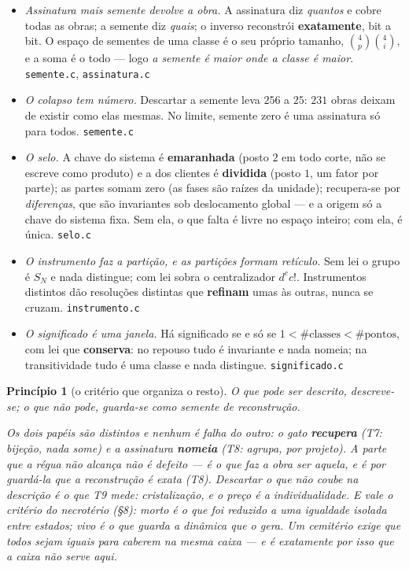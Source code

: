 \documentclass[11pt]{article}
\newcommand{\code}[1]{\texttt{\small #1}}
\theoremstyle{plain}
\newtheorem{principio}{Princípio}
\theoremstyle{remark}
\begin{document}
\begin{itemize}
\hfill{\small\code{espelho.c}}
\item[\textbf{T8}] \emph{Assinatura mais semente devolve a obra.} A assinatura diz \emph{quantos} e
cobre todas as obras; a semente diz \emph{quais}; o inverso reconstrói \textbf{exatamente}, bit a bit.
O espaço de sementes de uma classe é o seu próprio tamanho, $\binom4p\binom4i$, e a soma é o todo ---
logo \emph{a semente é maior onde a classe é maior}.
\hfill{\small\code{semente.c}, \code{assinatura.c}}
\item[\textbf{T9}] \emph{O colapso tem número.} Descartar a semente leva $256$ a $25$: $231$ obras
deixam de existir como elas mesmas. No limite, semente zero é uma assinatura só para todos.
\hfill{\small\code{semente.c}}
\item[\textbf{T10}] \emph{O selo.} A chave do sistema é \textbf{emaranhada} (posto $2$ em todo corte,
não se escreve como produto) e a dos clientes é \textbf{dividida} (posto $1$, um fator por parte); as
partes somam zero (as fases são raízes da unidade); recupera-se por \emph{diferenças}, que são
invariantes sob deslocamento global --- e a origem só a chave do sistema fixa. Sem ela, o que falta é
livre no espaço inteiro; com ela, é única.
\hfill{\small\code{selo.c}}
\item[\textbf{T11}] \emph{O instrumento faz a partição, e as partições formam retículo.} Sem lei o
grupo é $S_N$ e nada distingue; com lei sobra o centralizador $d^cc!$. Instrumentos distintos dão
resoluções distintas que \textbf{refinam} umas às outras, nunca se cruzam.
\hfill{\small\code{instrumento.c}}
\item[\textbf{T12}] \emph{O significado é uma janela.} Há significado se e só se
$1<\#\text{classes}<\#\text{pontos}$, com lei que \textbf{conserva}: no repouso tudo é invariante e
nada nomeia; na transitividade tudo é uma classe e nada distingue.
\hfill{\small\code{significado.c}}
\end{itemize}

\begin{principio}[o critério que organiza o resto]
\emph{O que pode ser descrito, descreve-se; o que não pode, guarda-se como semente de reconstrução.}

Os dois papéis são distintos e nenhum é falha do outro: o gato \textbf{recupera} (T7: bijeção, nada
some) e a assinatura \textbf{nomeia} (T8: agrupa, por projeto). A parte que a régua não alcança não é
defeito --- é o que faz a obra ser aquela, e é por guardá-la que a reconstrução é exata (T8). Descartar
o que não coube na descrição é o que T9 mede: cristalização, e o preço é a individualidade.
E vale o critério do necrotério (§8): morto é o que foi reduzido a uma igualdade isolada entre estados;
vivo é o que guarda a dinâmica que o gera. \emph{Um cemitério exige que todos sejam iguais para caberem
na mesma caixa --- e é exatamente por isso que a caixa não serve aqui.}
\end{principio}
\end{document}
